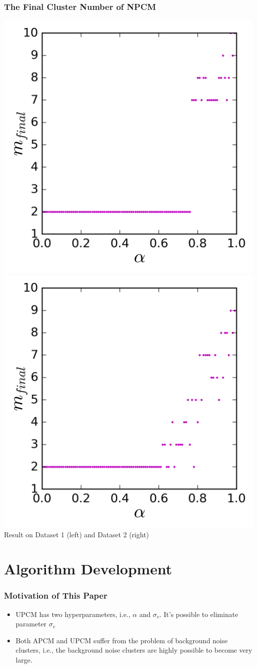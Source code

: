 \documentclass{beamer}
\begin{document}
\begin{frame}
  \frametitle{The Final Cluster Number of NPCM}
  \includegraphics[width=0.5\columnwidth]{img/exmp_npcm_fcm_dif_variance.png}
  \includegraphics[width=0.5\columnwidth]{img/exmp_npcm_fcm_close.png}
  \\
  Result on Dataset 1 (left) and Dataset 2 (right)
\end{frame}

\section{Algorithm Development}


\begin{frame}
  \frametitle{Motivation of This Paper}
  \begin{itemize}
  \item {UPCM has two hyperparameters, i.e., $\alpha$ and
      $\sigma_v$. It's possible to eliminate parameter $\sigma_v$}
    \pause
  \item Both APCM and UPCM suffer from the problem of background noise
    clusters, i.e., the background noise clusters are highly possible
    to become very large.
  \end{itemize}
\end{frame}
\end{document}
